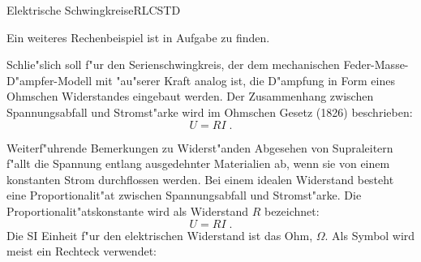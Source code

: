 \begin{MXContent}{Elektrische Schwingkreise}{RLC}{STD}
\begin{MExample}
\begin{center}
\end{center}

\end{MExample}

Ein weiteres Rechenbeispiel ist in Aufgabe
zu finden.

Schlie"slich soll f"ur den Serienschwingkreis, der dem mechanischen Feder-Masse-D"ampfer-Modell mit "au"serer Kraft analog ist, die D"ampfung in Form eines Ohmschen Widerstandes eingebaut werden. Der Zusammenhang zwischen Spannungsabfall und Stromst"arke wird im Ohmschen Gesetz (1826) beschrieben: 
\begin{equation}
U=R I\; .
\end{equation}

  \begin{MHint}{Weiterf"uhrende Bemerkungen zu Widerst"anden}
  Abgesehen von Supraleitern f"allt die Spannung entlang ausgedehnter Materialien ab, wenn sie von einem konstanten Strom durchflossen werden. Bei einem idealen Widerstand besteht eine Proportionalit"at zwischen Spannungsabfall und Stromst"arke. Die Proportionalit"atskonstante wird als Widerstand $R$ bezeichnet:
  $$
  U=R I\; .
  $$
  Die SI Einheit f"ur den elektrischen Widerstand ist das Ohm, $\Omega$. Als Symbol wird meist ein Rechteck verwendet:
  \begin{center}
    \end{center}

  \end{MHint}


\end{MXContent}
